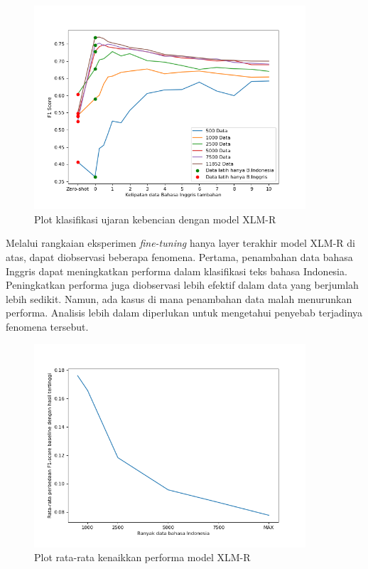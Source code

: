 \begin{enumerate}
            \begin{figure}[ht]
                \centering
                \includegraphics[width=0.9\textwidth]{resources/plot-head-toxic-xlmr.png}
                \caption{Plot klasifikasi ujaran kebencian dengan model XLM-R}
                \label{fig:plot_head_toxic_xlmr}
            \end{figure}

        \end{enumerate}

        Melalui rangkaian eksperimen \textit{fine-tuning} hanya layer terakhir model XLM-R di atas, dapat diobservasi beberapa fenomena. Pertama, penambahan data bahasa Inggris dapat meningkatkan performa dalam klasifikasi teks bahasa Indonesia. Peningkatkan performa juga diobservasi lebih efektif dalam data yang berjumlah lebih sedikit. Namun, ada kasus di mana penambahan data malah menurunkan performa. Analisis lebih dalam diperlukan untuk mengetahui penyebab terjadinya fenomena tersebut.

        \begin{figure}[htb]
            \centering
            \includegraphics[width=0.9\textwidth]{resources/plot-gain-xlmr.png}
            \caption{Plot rata-rata kenaikkan performa model XLM-R}
            \label{fig:plot_gain}
        \end{figure}

